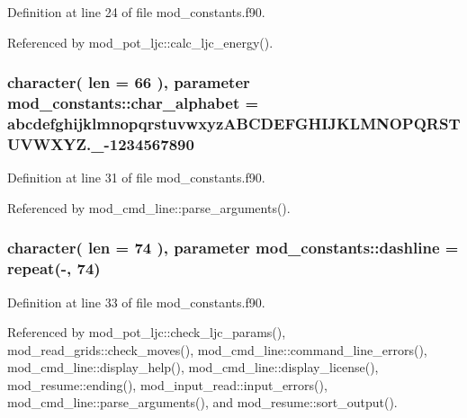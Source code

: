 Definition at line 24 of file mod\+\_\+constants.\+f90.



Referenced by mod\+\_\+pot\+\_\+ljc\+::calc\+\_\+ljc\+\_\+energy().

\subsubsection[{\texorpdfstring{char\+\_\+alphabet}{char_alphabet}}]{\setlength{\rightskip}{0pt plus 5cm}character( len = 66 ), parameter mod\+\_\+constants\+::char\+\_\+alphabet = \textquotesingle{}abcdefghijklmnopqrstuvwxyz\+A\+B\+C\+D\+E\+F\+G\+H\+I\+J\+K\+L\+M\+N\+O\+P\+Q\+R\+S\+T\+U\+V\+W\+X\+Y\+Z.\+\_\+-\/1234567890 \textquotesingle{}}\hypertarget{namespacemod__constants_a1d9e53f57f87f727d4dd13f1dd4b8e45}{}\label{namespacemod__constants_a1d9e53f57f87f727d4dd13f1dd4b8e45}


Definition at line 31 of file mod\+\_\+constants.\+f90.



Referenced by mod\+\_\+cmd\+\_\+line\+::parse\+\_\+arguments().

\subsubsection[{\texorpdfstring{dashline}{dashline}}]{\setlength{\rightskip}{0pt plus 5cm}character( len = 74 ), parameter mod\+\_\+constants\+::dashline = repeat(\textquotesingle{}-\/\textquotesingle{}, 74)}\hypertarget{namespacemod__constants_ab55dac3c52ff6b1034697c6e83ac76d8}{}\label{namespacemod__constants_ab55dac3c52ff6b1034697c6e83ac76d8}


Definition at line 33 of file mod\+\_\+constants.\+f90.



Referenced by mod\+\_\+pot\+\_\+ljc\+::check\+\_\+ljc\+\_\+params(), mod\+\_\+read\+\_\+grids\+::check\+\_\+moves(), mod\+\_\+cmd\+\_\+line\+::command\+\_\+line\+\_\+errors(), mod\+\_\+cmd\+\_\+line\+::display\+\_\+help(), mod\+\_\+cmd\+\_\+line\+::display\+\_\+license(), mod\+\_\+resume\+::ending(), mod\+\_\+input\+\_\+read\+::input\+\_\+errors(), mod\+\_\+cmd\+\_\+line\+::parse\+\_\+arguments(), and mod\+\_\+resume\+::sort\+\_\+output().

